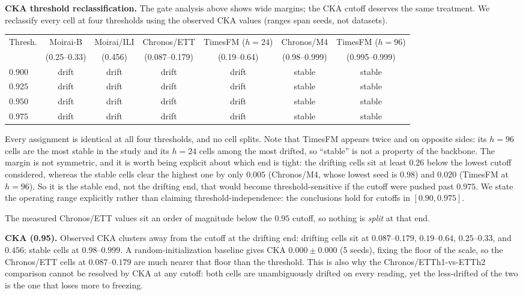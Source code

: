 \documentclass{article}
\begin{document}
\textbf{CKA threshold reclassification.}
The gate analysis above shows wide margins; the CKA cutoff deserves the same treatment. We
reclassify every cell at four thresholds using the observed CKA values (ranges span seeds, not
datasets).

\begin{center}
\footnotesize
\begin{tabular}{@{}lcccccc@{}}
\toprule
Thresh. & Moirai-B & Moirai/ILI & Chronos/ETT & TimesFM ($h{\scriptstyle=}24$) & Chronos/M4 & TimesFM ($h{\scriptstyle=}96$) \\
& (0.25--0.33) & (0.456) & (0.087--0.179) & (0.19--0.64) & (0.98--0.999) & (0.995--0.999) \\
\midrule
$0.900$ & drift & drift & drift & drift & stable & stable \\
$0.925$ & drift & drift & drift & drift & stable & stable \\
$0.950$ & drift & drift & drift & drift & stable & stable \\
$0.975$ & drift & drift & drift & drift & stable & stable \\
\bottomrule
\end{tabular}
\end{center}

Every assignment is identical at all four thresholds, and no cell splits. Note that TimesFM appears
twice and on opposite sides: its $h{=}96$ cells are the most stable in the study and its $h{=}24$
cells among the most drifted, so ``stable'' is not a property of the backbone. The margin is not
symmetric, and it is worth being explicit about which end is tight: the drifting cells sit
at least $0.26$ below the lowest cutoff considered, whereas the stable cells clear the highest one
by only $0.005$ (Chronos/M4, whose lowest seed is $0.98$) and $0.020$ (TimesFM at $h{=}96$). So it is
the stable end, not the drifting end, that would become threshold-sensitive if the cutoff were pushed
past $0.975$. We state the operating range explicitly rather than claiming
threshold-independence: the conclusions hold for cutoffs in $[0.90, 0.975]$.

The measured Chronos/ETT values sit an order of magnitude below the $0.95$ cutoff, so nothing is
\emph{split} at that end.

\textbf{CKA (0.95).}
Observed CKA clusters away from the cutoff at the drifting end: drifting cells sit at
$0.087$--$0.179$, $0.19$--$0.64$, $0.25$--$0.33$, and $0.456$; stable cells at $0.98$--$0.999$.
A random-initialization baseline gives CKA $0.000{\pm}0.000$ (5 seeds), fixing the floor of the
scale, so the Chronos/ETT cells at $0.087$--$0.179$ are much nearer that floor than the threshold.
This is also why the Chronos/ETTh1-vs-ETTh2 comparison cannot be resolved by CKA at any cutoff:
both cells are unambiguously drifted on every reading, yet the less-drifted of the two is the one
that loses more to freezing.
\end{document}
